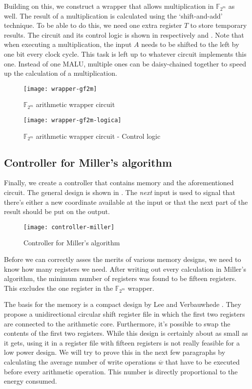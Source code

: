 Building on this, we construct a wrapper that allows multiplication in $\mathbb{F}_{2^m}$ as well. The result of a multiplication is calculated using the `shift-and-add' technique. To be able to do this, we need one extra register $T$ to store temporary results. The circuit and its control logic is shown in respectively  and . Note that when executing a multiplication, the input $A$ needs to be shifted to the left by one bit every clock cycle. This task is left up to whatever circuit implements this one. Instead of one MALU, multiple ones can be daisy-chained together to speed up the calculation of a multiplication.

\begin{figure}[h]
	\centering
		\texttt{[image: wrapper-gf2m]}
		\caption{$\mathbb{F}_{2^m}$ arithmetic wrapper circuit\label{figure-gf2m}}
\end{figure}

\begin{figure}[h]
	\centering
		\texttt{[image: wrapper-gf2m-logica]}
		\caption{$\mathbb{F}_{2^m}$ arithmetic wrapper circuit - Control logic\label{figure-gf2m-logic}}
\end{figure}

\subsection{Controller for Miller's algorithm}

Finally, we create a controller that contains memory and the aforementioned circuit. The general design is shown in . The \emph{next} input is used to signal that there's either a new coordinate available at the input or that the next part of the result should be put on the output.

\begin{figure}[h]
	\centering
		\texttt{[image: controller-miller]}
		\caption{Controller for Miller's algorithm\label{figure-controller}}
\end{figure}

Before we can correctly asses the merits of various memory designs, we need to know how many registers we need. After writing out every calculation in Miller's algorithm, the minimum number of registers was found to be fifteen registers. This excludes the one register in the $\mathbb{F}_{2^m}$ wrapper. 

The basis for the memory is a compact design by Lee and Verbauwhede \cite{lee}. They propose a unidirectional circular shift register file in which the first two registers are connected to the arithmetic core. Furthermore, it's possible to swap the contents of the first two registers. While this design is certainly about as small as it gets, using it in a register file with fifteen registers is not really feasible for a low power design. We will try to prove this in the next few paragraphs by calculating the average number of write operations $\overline{w}$ that have to be executed before every arithmetic operation. This number is directly proportional to the energy consumed.

